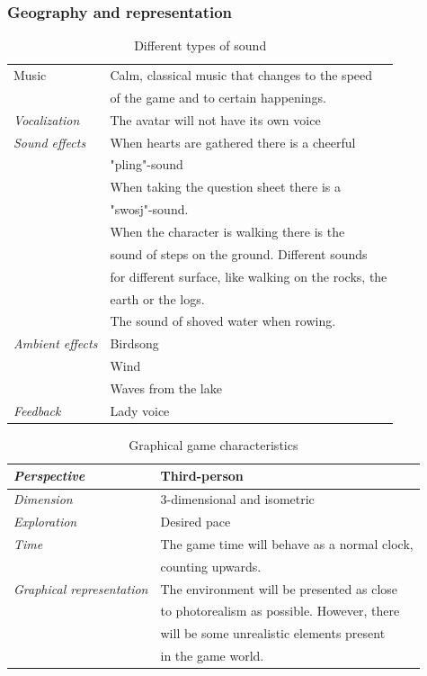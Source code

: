 \subsubsection{Geography and representation}

\begin{table} [H]
\centering
    \begin{tabular}{|l|l|}
       \hline
       {Music} & Calm, classical music that changes to the speed \\ & of the game and to certain happenings. \\ \hline
       \emph{Vocalization} & The avatar will not have its own voice \\ \hline
       \emph{Sound effects} &  When hearts are gathered there is a cheerful \\ &  "pling"-sound  \\ \cline{2-2}
	    &  When taking the question sheet there is a \\ & "swosj"-sound.\\ \cline{2-2}
	     & When the character is walking there is the \\ & sound of steps on the ground. Different sounds \\ &  for different surface, like walking on the rocks, the \\ &  earth or the logs.\\ \cline{2-2}
	       & The sound of shoved water when rowing. \\ \hline
	       \emph{Ambient effects} & Birdsong \\ \cline{2-2}
	         & Wind \\ \cline{2-2}
	         & Waves from the lake \\ \hline
	         \emph{Feedback} & Lady voice \\ \hline
    \end{tabular}
    \caption[Different types of sound]{Different types of sound}
    \label{tab:sound1}
\end{table}  

\begin{table} [H]
\centering
    \begin{tabular}{|l|l|}
       \hline
      \emph {Perspective} & Third-person \\ \hline
       \emph{Dimension} &  3-dimensional and isometric \\ \hline
	       \emph{Exploration} & Desired pace \\ \hline
	       \emph{Time} & The game time will behave as a normal clock, \\ & counting upwards. \\ \hline
	       \emph{Graphical representation} & The environment will be presented as close \\ & to photorealism as possible. However, there \\ & will be some unrealistic elements present \\ & in the game world.  \\ \hline
    \end{tabular}
    \caption[Graphical game characteristics]{Graphical game characteristics}
    \label{tab:graphical1}
\end{table}  

